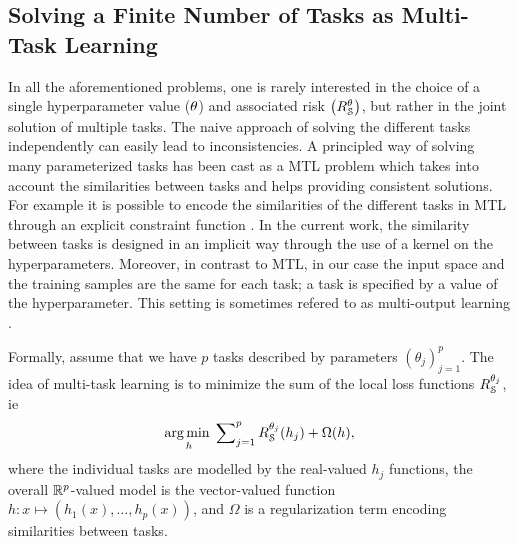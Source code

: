 \subsection{Solving a Finite Number of Tasks as Multi-Task Learning} \label{sec:multi-task}
In all the  aforementioned problems, one is rarely interested in the choice of
a single hyperparameter value ($\theta$) and associated risk
$\left(R_{\mathcal{S}}^{\theta}\right)$, but rather in the joint
solution of multiple tasks. The naive approach of solving the different tasks
independently can easily lead to inconsistencies. A principled way of solving
many parameterized tasks has been cast as a \ac{MTL} problem
\citep{Evgeniou2005} which takes into account the similarities between tasks
and helps providing consistent solutions. For example it is possible to encode
the similarities of the different tasks in \ac{MTL} through an explicit constraint function
\citep{ciliberto2017consistent}.
%
In the current work, the similarity between tasks is designed in an implicit way
through the use of a kernel on the hyperparameters. Moreover, in contrast to \ac{MTL},
in our case the input space and the training samples are the same for each task; a task is specified by
a value of the hyperparameter. This setting is sometimes refered to as multi-output learning
\citep{Alvarez2012}.
\par
%
Formally, assume that we have $p$ tasks
described by parameters $(\theta_j)_{j=1}^p$. The idea of multi-task learning
is to minimize the sum of the local loss functions
$R_{\mathcal{S}}^{\theta_j}$, \ac{ie}
\begin{align*}
  \operatorname*{{\mathbf{\mathrm{arg\,min}\;}}}_{h} \displaystyle\sum\nolimits_{j=1}^p
  R_{\mathcal{S}}^{\theta_j}(h_j) + \Omega(h),
\end{align*}
where the individual tasks are modelled by the real-valued $h_j$ functions,
the overall $\mathbb{R}^p$-valued model is the vector-valued function
$h \colon x\mapsto(h_1(x),\ldots,h_p(x))$, and $\Omega$ is a regularization term
encoding similarities between tasks.

